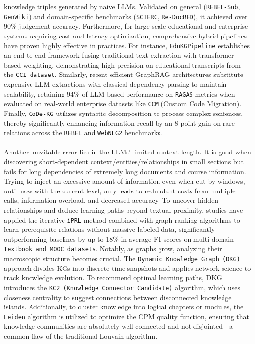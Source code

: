 knowledge triples generated by naive LLMs. Validated on general (\texttt{REBEL-Sub}, \texttt{GenWiki}) and domain-specific benchmarks (\texttt{SCIERC}, 
\texttt{Re-DocRED}), it achieved over 90\% judgement accuracy. Furthermore, for large-scale educational and enterprise systems requiring cost and latency 
optimization, comprehensive hybrid pipelines have proven highly effective in practices. For instance, \texttt{EduKGPipeline} \cite{EduKGPipeline} establishes 
an end-to-end framework fusing traditional text extraction with transformer-based weighting, demonstrating high precision on educational transcripts from the 
\texttt{CCI dataset}. Similarly, recent efficient GraphRAG architectures \cite{GraphRAG} substitute expensive LLM extractions with classical dependency parsing 
to maintain scalability, retaining 94\% of LLM-based performance on \texttt{RAGAS} metrics when evaluated on real-world enterprise datasets like \texttt{CCM} 
(Custom Code Migration). Finally, \texttt{CoDe-KG} \cite{CoDeKG} utilizes syntactic decomposition to process complex sentences, thereby significantly enhancing 
information recall by an 8-point gain on rare relations across the \texttt{REBEL} and \texttt{WebNLG2} benchmarks.
\\\\
Another inevitable error lies in the LLMs' limited context length. It is good when discovering short-dependent context/entities/relationships in small sections but fails for long dependencies of extremely long documents and course information. Trying to inject an excessive amount of information even when cut by windows, until now with the current level, only leads to redundant costs from multiple calls, information overload, and decreased accuracy. To uncover hidden relationships and deduce learning paths beyond textual proximity, studies have applied the iterative \texttt{iPRL} \cite{iPRL} method combined with graph-ranking algorithms to learn prerequisite relations without massive labeled data, significantly outperforming baselines by up to 18\% in average F1 scores on multi-domain \texttt{Textbook and MOOC datasets}. Notably, as graphs grow, analyzing their macroscopic structure becomes crucial. The \texttt{Dynamic Knowledge Graph (DKG)} \cite{DKG} approach divides KGs into discrete time snapshots and applies network science to track knowledge evolution. To recommend optimal learning paths, DKG introduces the \texttt{KC2 (Knowledge Connector Candidate)} algorithm, which uses closeness centrality to suggest connections between disconnected knowledge islands. Additionally, to cluster knowledge into logical chapters or modules, the \texttt{Leiden} \cite{Leiden} algorithm is utilized to optimize the CPM quality function, ensuring that knowledge communities are absolutely well-connected and not disjointed—a common flaw of the traditional Louvain algorithm.
